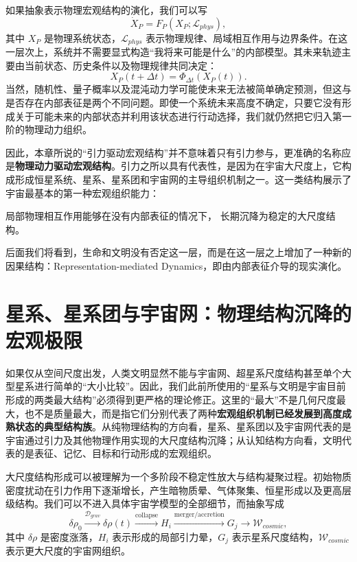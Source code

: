 如果抽象表示物理宏观结构的演化，我们可以写
\[
\dot{X}_{P}
=
F_{P}
\left(
X_{P};
\mathcal{L}_{phys}
\right),
\]
其中 $X_P$ 是物理系统状态，$\mathcal{L}_{phys}$ 表示物理规律、局域相互作用与边界条件。在这一层次上，系统并不需要显式构造“我将来可能是什么”的内部模型。其未来轨迹主要由当前状态、历史条件以及物理规律共同决定：
\[
X_P(t+\Delta t)
=
\Phi_{\Delta t}
\left(
X_P(t)
\right).
\]
当然，随机性、量子概率以及混沌动力学可能使未来无法被简单确定预测，但这与是否存在内部表征是两个不同问题。即使一个系统未来高度不确定，只要它没有形成关于可能未来的内部状态并利用该状态进行行动选择，我们就仍然把它归入第一阶的物理动力组织。

因此，本章所说的“引力驱动宏观结构”并不意味着只有引力参与，更准确的名称应是\textbf{物理动力驱动宏观结构}。引力之所以具有代表性，是因为在宇宙大尺度上，它构成形成恒星系统、星系、星系团和宇宙网的主导组织机制之一。这一类结构展示了宇宙最基本的第一种宏观组织能力：
\begin{statementbox}
局部物理相互作用能够在没有内部表征的情况下，
长期沉降为稳定的大尺度结构。
\end{statementbox}
后面我们将看到，生命和文明没有否定这一层，而是在这一层之上增加了一种新的因果结构：Representation-mediated Dynamics，即由内部表征介导的现实演化。

\section{星系、星系团与宇宙网：物理结构沉降的宏观极限}

如果仅从空间尺度出发，人类文明显然不能与宇宙网、超星系尺度结构甚至单个大型星系进行简单的“大小比较”。因此，我们此前所使用的“星系与文明是宇宙目前形成的两类最大结构”必须得到更严格的理论修正。这里的“最大”不是几何尺度最大，也不是质量最大，而是指它们分别代表了两种\textbf{宏观组织机制已经发展到高度成熟状态的典型结构族}。从纯物理结构的方向看，星系、星系团以及宇宙网代表的是宇宙通过引力及其他物理作用实现的大尺度结构沉降；从认知结构方向看，文明代表的是表征、记忆、目标和行动形成的宏观组织。

大尺度结构形成可以被理解为一个多阶段不稳定性放大与结构凝聚过程。初始物质密度扰动在引力作用下逐渐增长，产生暗物质晕、气体聚集、恒星形成以及更高层级结构。我们可以不进入具体宇宙学模型的全部细节，而抽象写成
\[
\delta\rho_0
\xrightarrow{\mathcal{D}_{grav}}
\delta\rho(t)
\xrightarrow{\text{collapse}}
H_i
\xrightarrow{\text{merger/accretion}}
G_j
\xrightarrow{}
\mathcal{W}_{cosmic},
\]
其中 $\delta\rho$ 是密度涨落，$H_i$ 表示形成的局部引力晕，$G_j$ 表示星系尺度结构，$\mathcal{W}_{cosmic}$ 表示更大尺度的宇宙网组织。

